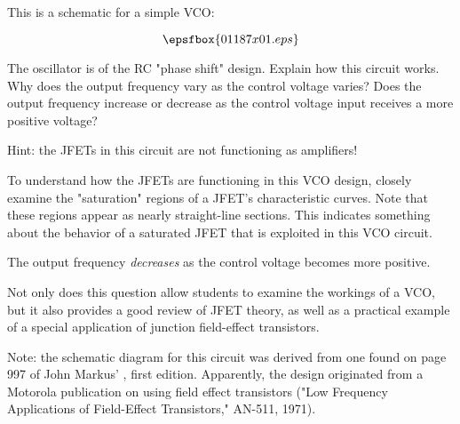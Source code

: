

This is a schematic for a simple VCO:

$$\epsfbox{01187x01.eps}$$

The oscillator is of the RC "phase shift" design.  Explain how this circuit works.  Why does the output frequency vary as the control voltage varies?  Does the output frequency increase or decrease as the control voltage input receives a more positive voltage?

Hint: the JFETs in this circuit are not functioning as amplifiers!







To understand how the JFETs are functioning in this VCO design, closely examine the "saturation" regions of a JFET's characteristic curves.  Note that these regions appear as nearly straight-line sections.  This indicates something about the behavior of a saturated JFET that is exploited in this VCO circuit.

The output frequency {\it decreases} as the control voltage becomes more positive.







Not only does this question allow students to examine the workings of a VCO, but it also provides a good review of JFET theory, as well as a practical example of a special application of junction field-effect transistors.

Note: the schematic diagram for this circuit was derived from one found on page 997 of John Markus' , first edition.  Apparently, the design originated from a Motorola publication on using field effect transistors ("Low Frequency Applications of Field-Effect Transistors," AN-511, 1971).




